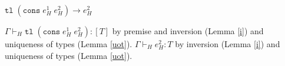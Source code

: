 \begin{case}
$\mathtt{tl}\;(\mathtt{cons}\;e_{H}^{1}\;e_{H}^{2})\rightarrow e_{H}^{2}$

$\Gamma\vdash_{H}\mathtt{tl}\;(\mathtt{cons}\;e_{H}^{1}\;e_{H}^{2}):[T]$ by premise and inversion (Lemma \ref{i}) and uniqueness of types (Lemma \ref{uot}).  $\Gamma\vdash_{H}e_{H}^{2}:T$ by inversion (Lemma \ref{i}) and uniqueness of types (Lemma \ref{uot}).
\end{case}